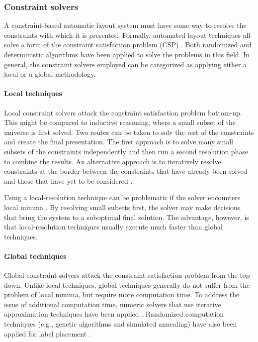     \subsubsection{Constraint solvers}

     A constraint-based automatic layout system must have some way to resolve
     the constraints with which it is presented. Formally, automated layout
     techniques all solve a form of the constraint satisfaction problem (CSP)
     \citep{mackworth-2,mackworth-1}. Both randomized and deterministic
     algorithms have been applied to solve the problems in this field. In
     general, the constraint solvers employed can be categorized as applying
     either a local or a global methodology.

     \paragraph{Local techniques}

      Local constraint solvers attack the constraint satisfaction problem
      bottom-up. This might be compared to inductive reasoning, where a small
      subset of the universe is first solved. Two routes can be taken to solv the
      rest of the constraints and create the final presentation. The first
      approach is to solve many small subsets of the constraints independently
      and then run a second resolution phase to combine the results. An
      alternative approach is to iteratively resolve constraints at the border
      between the constraints that have already been solved and those that have
      yet to be considered \citep{nilsson-1}.

      Using a local-resolution technique can be problematic if the solver
      encounters local minima \citep{borning-2}. By resolving small subsets
      first, the solver may make decisions that bring the system to a suboptimal
      final solution. The advantage, however, is that local-resolution techniques
      usually execute much faster than global techniques.

     \paragraph{Global techniques}

      Global constraint solvers attack the constraint satisfaction problem from
      the top down. Unlike local techniques, global techniques generally do not
      suffer from the problem of local minima, but require more computation time.
      To address the issue of additional computation time, numeric solvers that
      use iterative approximation techniques have been applied
      \citep{kurlander-1}. Randomized computation techniques (e.g., genetic
      algorithms and simulated annealing) have also been applied for label
      placement \citep{christensen-2}.

